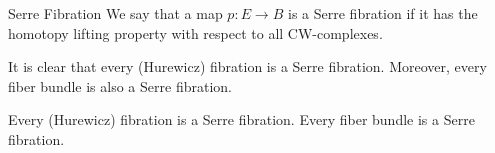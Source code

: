 \documentclass[a4paper]{article}
\begin{document}
\begin{defn}{Serre Fibration}{} We say that a map $p:E\to B$ is a Serre fibration if it has the homotopy lifting property with respect to all CW-complexes. 
\end{defn}

It is clear that every (Hurewicz) fibration is a Serre fibration. Moreover, every fiber bundle is also a Serre fibration. 

\begin{prp}{}{} Every (Hurewicz) fibration is a Serre fibration. Every fiber bundle is a Serre fibration. 
\end{prp}
\end{document}
